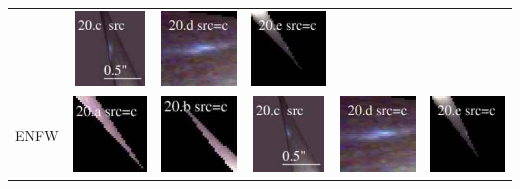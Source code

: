 \documentclass[useAMS,usenatbib]{mn2e}
\begin{document}
\begin{table}
\begin{tabular}{cccccc}
    & \multicolumn{1}{m{1.7cm}}{\includegraphics[height=2.00cm,clip]{figs/nsie_img/rgb.src_20_c.ps}}
    & \multicolumn{1}{m{1.7cm}}{\includegraphics[height=2.00cm,clip]{figs/nsie_img/rgb.pre_20_d_c_tri.ps}}
    & \multicolumn{1}{m{1.7cm}}{\includegraphics[height=2.00cm,clip]{figs/nsie_img/rgb.pre_20_e_c_tri.ps}} \\
    \multicolumn{1}{m{1cm}}{{\Large ENFW}}
    & \multicolumn{1}{m{1.7cm}}{\includegraphics[height=2.00cm,clip]{figs/enfw_img/rgb.pre_20_a_c_tri.ps}}
    & \multicolumn{1}{m{1.7cm}}{\includegraphics[height=2.00cm,clip]{figs/enfw_img/rgb.pre_20_b_c_tri.ps}}
    & \multicolumn{1}{m{1.7cm}}{\includegraphics[height=2.00cm,clip]{figs/enfw_img/rgb.src_20_c.ps}}
    & \multicolumn{1}{m{1.7cm}}{\includegraphics[height=2.00cm,clip]{figs/enfw_img/rgb.pre_20_d_c_tri.ps}}
    & \multicolumn{1}{m{1.7cm}}{\includegraphics[height=2.00cm,clip]{figs/enfw_img/rgb.pre_20_e_c_tri.ps}} \\
  \end{tabular}

\end{table}
\end{document}
